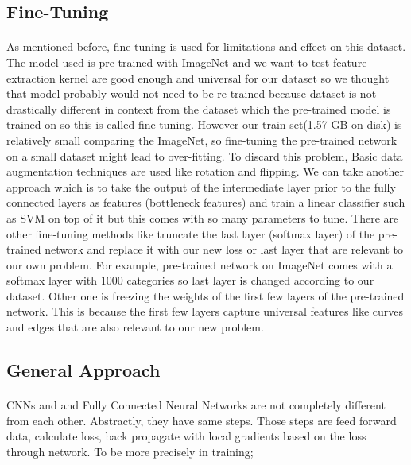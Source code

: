 \documentclass[12pt]{article}
\begin{document}
\subsection{Fine-Tuning}

\paragraph{}As mentioned before, fine-tuning is used for limitations and effect on this dataset. The model used is pre-trained with ImageNet and we want to test feature extraction kernel are good enough and universal for our dataset so we thought that model probably would not need to be re-trained because dataset is not drastically different in context from the dataset which the pre-trained model is trained on so this is called fine-tuning. However our train set(1.57 GB on disk) is relatively small comparing the ImageNet, so fine-tuning the pre-trained network on a small dataset might lead to over-fitting. To discard this problem, Basic data augmentation techniques are used like rotation and flipping. We can take another approach which is to take the output of the intermediate layer prior to the fully connected layers as features (bottleneck features) and train a linear classifier such as SVM on top of it but this comes with so many parameters to tune. There are other fine-tuning methods like truncate the last layer (softmax layer) of the pre-trained network and replace it with our new loss or last layer that are relevant to our own problem. For example, pre-trained network on ImageNet comes with a softmax layer with 1000 categories so last layer is changed according to our dataset. Other one is freezing the weights of the first few layers of the pre-trained network. This is because the first few layers capture universal features like curves and edges that are also relevant to our new problem.
\subsection{General Approach}
\paragraph{} CNNs and and Fully Connected Neural Networks are not completely different from each other. Abstractly, they have same steps. Those steps are feed forward data, calculate loss, back propagate with local gradients based on the loss through network. To be more precisely in training;
\end{document}
